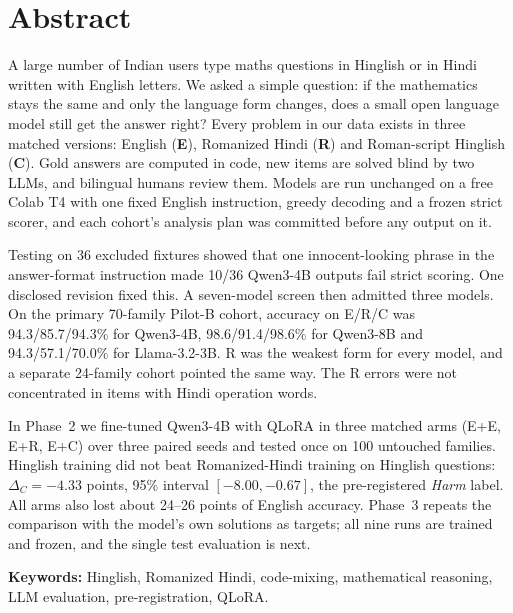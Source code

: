 \documentclass[12pt,a4paper,oneside]{report}
\renewcommand{\_}{\oldunderscore\allowbreak}
\newcommand{\form}[1]{\textbf{#1}}
\begin{document}
\chapter*{Abstract}
\thispagestyle{plain}

{
A large number of Indian users type maths questions in Hinglish or in Hindi written with English letters. We asked a simple question: if the mathematics stays the same and only the language form changes, does a small open language model still get the answer right? Every problem in our data exists in three matched versions: English (\form{E}), Romanized Hindi (\form{R}) and Roman-script Hinglish (\form{C}). Gold answers are computed in code, new items are solved blind by two LLMs, and bilingual humans review them. Models are run unchanged on a free Colab T4 with one fixed English instruction, greedy decoding and a frozen strict scorer, and each cohort's analysis plan was committed before any output on it.

Testing on 36 excluded fixtures showed that one innocent-looking phrase in the answer-format instruction made 10/36 Qwen3-4B outputs fail strict scoring. One disclosed revision fixed this. A seven-model screen then admitted three models. On the primary 70-family Pilot-B cohort, accuracy on E/R/C was 94.3/85.7/94.3\% for Qwen3-4B, 98.6/91.4/98.6\% for Qwen3-8B and 94.3/57.1/70.0\% for Llama-3.2-3B. R was the weakest form for every model, and a separate 24-family cohort pointed the same way. The R errors were not concentrated in items with Hindi operation words.

In Phase~2 we fine-tuned Qwen3-4B with QLoRA in three matched arms (E+E, E+R, E+C) over three paired seeds and tested once on 100 untouched families. Hinglish training did not beat Romanized-Hindi training on Hinglish questions: $\Delta_C = -4.33$ points, 95\% interval $[-8.00, -0.67]$, the pre-registered \emph{Harm} label. All arms also lost about 24--26 points of English accuracy. Phase~3 repeats the comparison with the model's own solutions as targets; all nine runs are trained and frozen, and the single test evaluation is next.

\medskip
\noindent\textbf{Keywords:} Hinglish, Romanized Hindi, code-mixing, mathematical reasoning, LLM evaluation, pre-registration, QLoRA.\par}

{
\tableofcontents
\listoffigures
\listoftables
}
\end{document}
